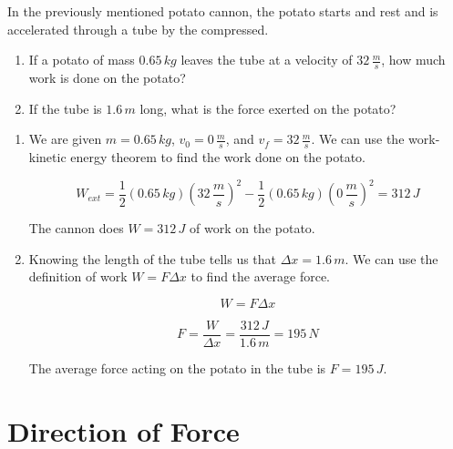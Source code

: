 \documentclass[12pt]{book}
\begin{document}
\begin{exampleblock}

In the previously mentioned potato cannon, the potato starts and rest and is accelerated through a tube by the compressed.

\begin{enumerate}
\item If a potato of mass $0.65 \, kg$ leaves the tube at a velocity of $32 \, \frac{m}{s}$, how much work is done on the potato?

\item If the tube is $1.6 \, m$ long, what is the force exerted on the potato?
\end{enumerate}

\hspace{10pt}

\begin{enumerate}
\item We are given $m = 0.65 \, kg$, $v_0 = 0 \, \frac{m}{s}$, and $v_f = 32 \, \frac{m}{s}$. We can use the work-kinetic energy theorem to find the work done on the potato.

\begin{equation}
W_{ext} = \frac{1}{2} (0.65 \, kg) (32 \, \frac{m}{s})^2 - \frac{1}{2} (0.65 \, kg) (0 \, \frac{m}{s})^2 = 312 \, J
\end{equation}

The cannon does $W = 312 \, J$ of work on the potato.

\item Knowing the length of the tube tells us that $\Delta x = 1.6 \, m$. We can use the definition of work $W = F \Delta x$ to find the average force.

\begin{equation}
W = F \Delta x
\end{equation}

\begin{equation}
F = \frac{W}{\Delta x} = \frac{312 \, J}{1.6 \, m} = 195 \, N
\end{equation}

The average force acting on the potato in the tube is $F = 195 \, J$. 

\end{enumerate}

\end{exampleblock}

\section{Direction of Force}
\end{document}
